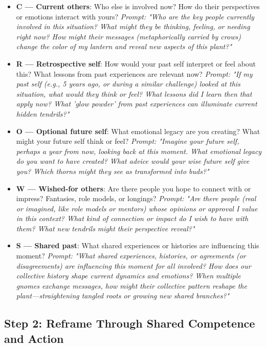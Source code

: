 \documentclass{article}
\begin{document}
\begin{itemize}[noitemsep,topsep=0pt]
    \item \textbf{C — Current others}: Who else is involved now? How do their perspectives or emotions interact with yours? \textit{Prompt: "Who are the key people currently involved in this situation? What might they be thinking, feeling, or needing right now? How might their messages (metaphorically carried by crows) change the color of my lantern and reveal new aspects of this plant?"}
    \item \textbf{R — Retrospective self}: How would your past self interpret or feel about this? What lessons from past experiences are relevant now? \textit{Prompt: "If my past self (e.g., 5 years ago, or during a similar challenge) looked at this situation, what would they think or feel? What lessons did I learn then that apply now? What 'glow powder' from past experiences can illuminate current hidden tendrils?"}
    \item \textbf{O — Optional future self}: What emotional legacy are you creating? What might your future self think or feel? \textit{Prompt: "Imagine your future self, perhaps a year from now, looking back at this moment. What emotional legacy do you want to have created? What advice would your wise future self give you? Which thorns might they see as transformed into buds?"}
    \item \textbf{W — Wished-for others}: Are there people you hope to connect with or impress? Fantasies, role models, or longings? \textit{Prompt: "Are there people (real or imagined, like role models or mentors) whose opinions or approval I value in this context? What kind of connection or impact do I wish to have with them? What new tendrils might their perspective reveal?"}
    \item \textbf{S — Shared past}: What shared experiences or histories are influencing this moment? \textit{Prompt: "What shared experiences, histories, or agreements (or disagreements) are influencing this moment for all involved? How does our collective history shape current dynamics and emotions? When multiple gnomes exchange messages, how might their collective pattern reshape the plant—straightening tangled roots or growing new shared branches?"}
\end{itemize}

\subsection{Step 2: Reframe Through Shared Competence and Action}
\end{document}
